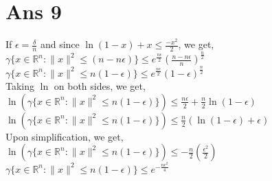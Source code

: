 \documentclass[10pt]{article}
\begin{document}
\section*{Ans 9}
\begin{flushleft}
If $\epsilon = \frac{\delta}{n}$ and since $\ln(1-x) + x \leq \frac{-x^{2}}{2}$, we get,\\
\vspace{0.5em}
$\gamma\{x \in \mathbb{R} ^{n}: \parallel x \parallel ^{2} \leq (n - n \epsilon)\} \leq e^{\frac{n \epsilon}{2}} (\frac{n- n \epsilon}{n}) ^ {\frac{n}{2}}$\\
\vspace{0.5em}
$\gamma\{x \in \mathbb{R} ^{n}: \parallel x \parallel ^{2} \leq n(1 - \epsilon)\} \leq e^{\frac{n \epsilon}{2}} (1 - \epsilon) ^ {\frac{n}{2}}$\\
Taking $\ln$ on both sides, we get,\\
\vspace{0.5em}
$\ln (\gamma\{x \in \mathbb{R} ^{n}: \parallel x \parallel ^{2} \leq n(1 - \epsilon)\}) \leq \frac{n \epsilon}{2} + \frac{n}{2} \ln(1 - \epsilon)$\\
\vspace{0.5em}
$\ln (\gamma\{x \in \mathbb{R} ^{n}: \parallel x \parallel ^{2} \leq n(1 - \epsilon)\}) \leq \frac{n}{2} (\ln(1 - \epsilon) + \epsilon)$\\
Upon simplification, we get,\\
\vspace{0.5em}
$\ln (\gamma\{x \in \mathbb{R} ^{n}: \parallel x \parallel ^{2} \leq n(1 - \epsilon)\}) \leq - \frac{n}{2} (\frac{\epsilon^{2}}{2})$\\
\vspace{0.5em}
$\gamma\{x \in \mathbb{R} ^{n}: \parallel x \parallel ^{2} \leq n(1 - \epsilon)\} \leq e^{-\frac{n \epsilon^{2}}{4}}$\\
\end{flushleft}
\vspace{10em}
\end{document}
